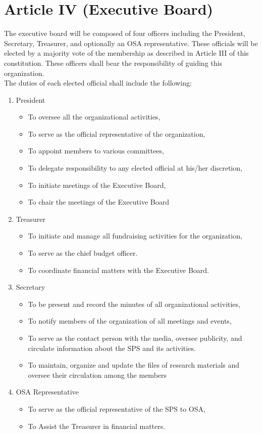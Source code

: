 \documentclass[12pt,a4paper]{article}
\begin{document}
\section{Article IV (Executive Board)}
The executive board will be composed of four officers including the President, Secretary, Treasurer, and optionally an OSA representative. These officials will be elected by a majority vote of the membership as described in Article III of this constitution. These officers shall bear the responsibility of guiding this organization.\\

The duties of each elected official shall include the following:

\begin{enumerate}[label=\Alph*.]
    \item President
    \begin{itemize}
        \item To oversee all the organizational activities,
        \item To serve as the official representative of the organization,
        \item To appoint members to various committees,
        \item To delegate responsibility to any elected official at his/her discretion,
        \item To initiate meetings of the Executive Board,
        \item To chair the meetings of the Executive Board
    \end{itemize}
    \item Treasurer
    \begin{itemize}
        \item To initiate and manage all fundraising activities for the organization,
        \item To serve as the chief budget officer.
        \item To coordinate financial matters with the Executive Board.
    \end{itemize}
    \item Secretary
    \begin{itemize}
        \item To be present and record the minutes of all organizational activities,
        \item To notify members of the organization of all meetings and events,
        \item To serve as the contact person with the media, oversee publicity, and circulate information about the SPS and its activities. 
        \item To maintain, organize and update the files of research materials and oversee their circulation among the members
    \end{itemize}
    \item OSA Representative
    \begin{itemize}
        \item To serve as the official representative of the SPS to OSA,
        \item To Assist the Treasurer in financial matters. 
    \end{itemize}
\end{enumerate}
\end{document}
